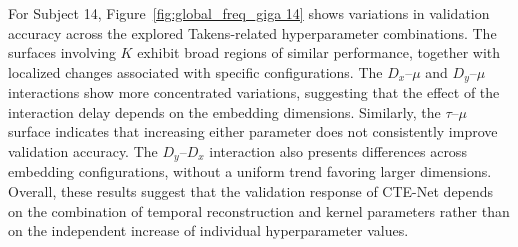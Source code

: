 For Subject 14, Figure~\ref{fig:global_freq_giga 14} shows variations in validation accuracy across the explored Takens-related hyperparameter combinations. The surfaces involving $K$ exhibit broad regions of similar performance, together with localized changes associated with specific configurations. The $D_x$--$\mu$ and $D_y$--$\mu$ interactions show more concentrated variations, suggesting that the effect of the interaction delay depends on the embedding dimensions. Similarly, the $\tau$--$\mu$ surface indicates that increasing either parameter does not consistently improve validation accuracy. The $D_y$--$D_x$ interaction also presents differences across embedding configurations, without a uniform trend favoring larger dimensions. Overall, these results suggest that the validation response of CTE-Net depends on the combination of temporal reconstruction and kernel parameters rather than on the independent increase of individual hyperparameter values.

